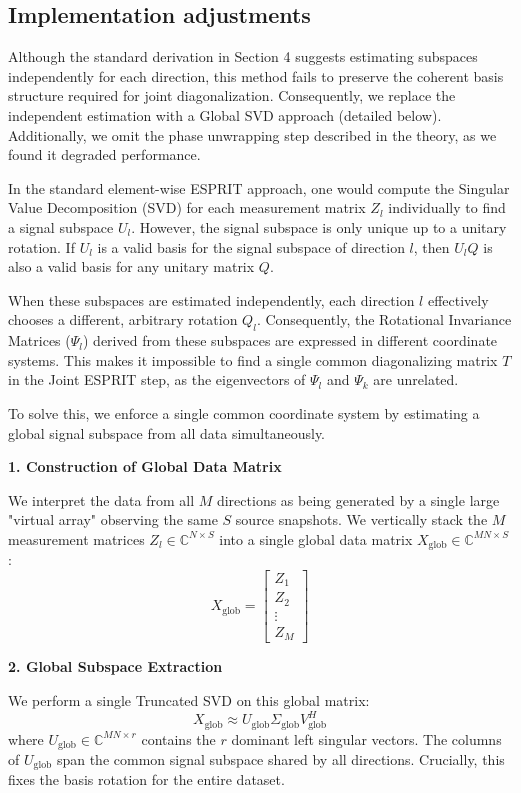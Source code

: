 \subsection{Implementation adjustments}
Although the standard derivation in Section 4 suggests estimating subspaces independently for each direction, this method fails to preserve the coherent basis structure required for joint diagonalization. Consequently, we replace the independent estimation with a Global SVD approach (detailed below). Additionally, we omit the phase unwrapping step described in the theory, as we found it degraded performance.

In the standard element-wise ESPRIT approach, one would compute the Singular Value Decomposition (SVD) for each measurement matrix $Z_l$ individually to find a signal subspace $U_l$. However, the signal subspace is only unique up to a unitary rotation. If $U_l$ is a valid basis for the signal subspace of direction $l$, then $U_l Q$ is also a valid basis for any unitary matrix $Q$.

When these subspaces are estimated independently, each direction $l$ effectively chooses a different, arbitrary rotation $Q_l$. Consequently, the Rotational Invariance Matrices ($\Psi_l$) derived from these subspaces are expressed in different coordinate systems. This makes it impossible to find a single common diagonalizing matrix $T$ in the Joint ESPRIT step, as the eigenvectors of $\Psi_l$ and $\Psi_k$ are unrelated.

To solve this, we enforce a single common coordinate system by estimating a global signal subspace from all data simultaneously.

\textbf{1. Construction of Global Data Matrix}

We interpret the data from all $M$ directions as being generated by a single large "virtual array" observing the same $S$ source snapshots. We vertically stack the $M$ measurement matrices $Z_l \in \mathbb{C}^{N \times S}$ into a single global data matrix $X_{\text{glob}} \in \mathbb{C}^{MN \times S}$:
\[
X_{\text{glob}} = \begin{bmatrix} Z_1 \\ Z_2 \\ \vdots \\ Z_M \end{bmatrix}
\]

\textbf{2. Global Subspace Extraction}

We perform a single Truncated SVD on this global matrix:
\[
X_{\text{glob}} \approx U_{\text{glob}} \Sigma_{\text{glob}} V_{\text{glob}}^H
\]
where $U_{\text{glob}} \in \mathbb{C}^{MN \times r}$ contains the $r$ dominant left singular vectors. The columns of $U_{\text{glob}}$ span the common signal subspace shared by all directions. Crucially, this fixes the basis rotation for the entire dataset.


